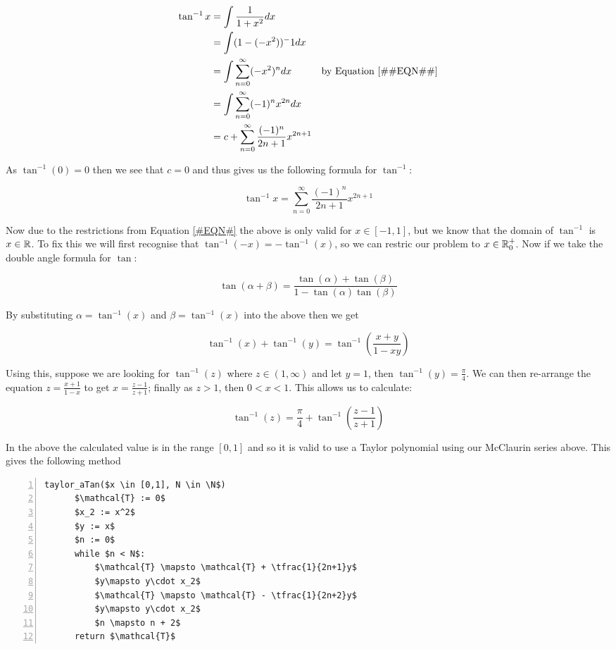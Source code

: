 {\begin{displaymath}
\begin{align*}
	\tan^{-1} x &= \int \frac{1}{1+x^2} dx\\
		&= \int (1 - (-x^2))^-1 dx\\
		&= \int \sum_{n=0}^\infty (-x^2)^n dx &\textrm{by Equation \ref{#EQN#}}\\
		&= \int \sum_{n=0}^\infty (-1)^nx^{2n} dx\\
		&= c + \sum_{n=0}^\infty \frac{(-1)^n}{2n+1}x^{2n+1}
\end{align*}
\end{displaymath}

As \(\tan^{-1} (0) = 0\) then we see that \(c = 0\) and thus gives us the following formula for \(\tan^{-1}\):

\[\tan^{-1} x = \sum_{n=0}^\infty \frac{(-1)^n}{2n+1}x^{2n+1}\]

Now due to the restrictions from Equation \ref{#EQN#} the above is only valid for \(x \in [-1, 1]\), but we know that the domain of \(\tan^{-1}\) is \(x \in \mathbb{R}\). To fix this we will first recognise that \(\tan^{-1}(-x) = -\tan^{-1}(x)\), so we can restric our problem to \(x \in \mathbb{R}^+_0\). Now if we take the double angle formula for \(\tan\):

\[\tan(\alpha + \beta) = \frac{\tan(\alpha) + \tan(\beta)}{1 - \tan(\alpha)\tan(\beta)}\]

By substituting \(\alpha = \tan^{-1}(x)\) and \(\beta = \tan^{-1}(x)\) into the above then we get

\[\tan^{-1}(x) + \tan^{-1}(y) = \tan^{-1}\left(\frac{x + y}{1 - xy}\right)\]

Using this, suppose we are looking for \(\tan^{-1}(z)\) where \(z \in (1, \infty)\) and let \(y = 1\), then \(\tan^{-1}(y) = \frac{\pi}{4}\). We can then re-arrange the equation \(z = \frac{x + 1}{1 - x}\) to get \(x = \frac{z - 1}{z + 1}\); finally as \(z > 1\), then \(0 < x < 1\). This allows us to calculate:

\[\tan^{-1}(z) = \frac{\pi}{4} + \tan^{-1}\left(\frac{z-1}{z+1}\right)\]

In the above the calculated value is in the range \([0, 1]\) and so it is valid to use a Taylor polynomial using our McClaurin series above. This gives the following method

\begin{lstlisting}[numbers=left,frame=single,mathescape,caption={Taylor Method for \(\tan^{-1}\)},label={PCD_"Taylor aTan"}]
  taylor_aTan($x \in [0,1], N \in \N$)
      $\mathcal{T} := 0$
      $x_2 := x^2$
      $y := x$
      $n := 0$
      while $n < N$:
          $\mathcal{T} \mapsto \mathcal{T} + \tfrac{1}{2n+1}y$
          $y\mapsto y\cdot x_2$
          $\mathcal{T} \mapsto \mathcal{T} - \tfrac{1}{2n+2}y$
          $y\mapsto y\cdot x_2$
          $n \mapsto n + 2$
      return $\mathcal{T}$
\end{lstlisting}

}
